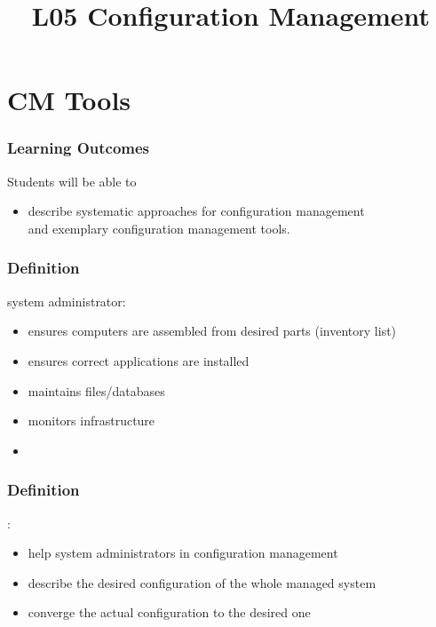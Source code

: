 

\title{L05 Configuration Management}



\section{CM Tools}

\begin{frame}
	\frametitle{Learning Outcomes}
	Students will be able to
	\begin{itemize}
	\item describe systematic approaches for configuration management \\ and exemplary configuration management tools.

	\end{itemize}
\end{frame}

\begin{frame}
	\frametitle{Definition}


	\vspace{1cm}
	system administrator:
	\pause

	\begin{itemize}[<+-| alert@+>]
	\item ensures computers are assembled from desired parts (inventory list)
	\item ensures correct applications are installed
	\item maintains files/databases
	\item monitors infrastructure
	\item {}
	\end{itemize}
\end{frame}

\begin{frame}
	\frametitle{Definition}

	:

	\begin{itemize}[<+-| alert@+>]
	\item help system administrators in configuration management
	\item describe the desired configuration of the whole managed system
	\item converge the actual configuration to the desired one~\cite{burgess1995cfengine}
	\end{itemize}
\end{frame}


